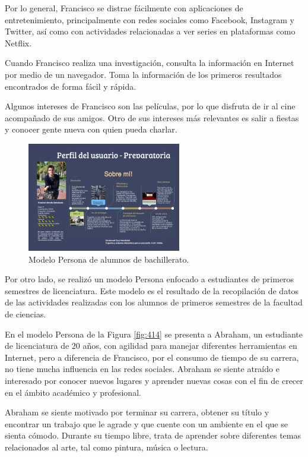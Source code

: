 Por lo general, Francisco se distrae fácilmente con aplicaciones de entretenimiento, principalmente con redes sociales como Facebook, Instagram y Twitter, así como con actividades relacionadas a ver series en plataformas como Netflix.

Cuando Francisco realiza una investigación, consulta la información en Internet por medio de un navegador. Toma la información de los primeros resultados encontrados de forma fácil y rápida.

Algunos intereses de Francisco son las películas, por lo que disfruta de ir al cine acompañado de sus amigos. Otro de sus intereses más relevantes es salir a fiestas y conocer gente nueva con quien pueda charlar.

\begin{figure}[H]
  \centering
  \includegraphics[width=0.60\textwidth]{Cap4/Figuras/Prepa.png}
  \caption{Modelo Persona de alumnos de bachillerato.}
  \label{fig:413}
\end{figure}

Por otro lado, se realizó un modelo Persona enfocado a estudiantes de primeros semestres de licenciatura. Este modelo es el resultado de la recopilación de datos de las actividades realizadas con los alumnos de primeros semestres de la facultad de ciencias.

En el modelo Persona de la Figura \ref{fig:414} se presenta a Abraham, un estudiante de licenciatura de 20 años, con agilidad para manejar diferentes herramientas en Internet, pero a diferencia de Francisco, por el consumo de tiempo de su carrera, no tiene mucha influencia en las redes sociales. Abraham se siente atraído e interesado por conocer nuevos lugares y aprender nuevas cosas con el fin de crecer en el ámbito académico y profesional.

Abraham se siente motivado por terminar su carrera, obtener su título y encontrar un trabajo que le agrade y que cuente con un ambiente en el que se sienta cómodo. Durante su tiempo libre, trata de aprender sobre diferentes temas relacionados al arte, tal como pintura, música o lectura.

